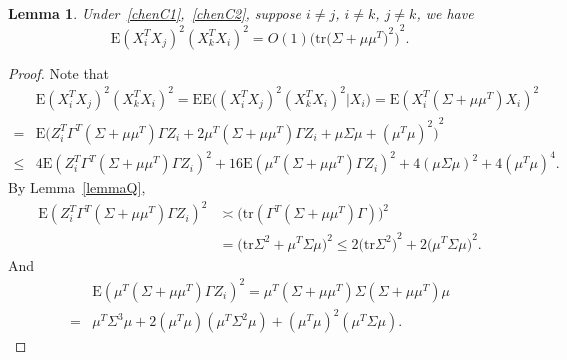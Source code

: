 \documentclass[review]{elsarticle}
\theoremstyle{plain}
\newtheorem{lemma}{Lemma}
\theoremstyle{definition}
\theoremstyle{remark}
\begin{document}
\begin{lemma}\label{smallLemma2}
    Under~\eqref{chenC1},~\eqref{chenC2}, suppose $i\neq j$, $i\neq k$, $j\neq k$, we have
    \begin{equation}\label{eq:2}
            \mathrm{E}{(X_i^T X_j)}^2{(X_k^T X_i)}^2=
             O(1){\Big(\mathrm{tr}{\big(\Sigma+\mu\mu^T\big)}^2\Big)}^2.
    \end{equation}
\end{lemma}
\begin{proof}
Note that
    \begin{equation*}
        \begin{aligned}
            &\mathrm{E}{(X_i^T X_j)}^2{(X_k^T X_i)}^2
            = 
            \mathrm{E}\mathrm{E}\big({(X_i^T X_j)}^2{(X_k^T X_i)}^2| X_i\big)
            =
            \mathrm{E}{(X_i^T (\Sigma+\mu\mu^T) X_i )}^2\\
            =&
            \mathrm{E}{\big(Z_i^T \Gamma^T (\Sigma+\mu\mu^T) \Gamma Z_i+ 2\mu^T (\Sigma+\mu\mu^T)\Gamma Z_i +\mu \Sigma \mu +(\mu^T\mu)^2 \big)}^2\\
            \leq&
            4\mathrm{E}(Z_i^T \Gamma^T (\Sigma+\mu\mu^T) \Gamma Z_i)^2+ 16\mathrm{E}(\mu^T (\Sigma+\mu\mu^T)\Gamma Z_i)^2 +4(\mu \Sigma \mu)^2 +4(\mu^T\mu)^4.
        \end{aligned}
    \end{equation*}
    By Lemma~\eqref{lemmaQ},
    \begin{equation*}
        \begin{aligned}
\mathrm{E}(Z_i^T \Gamma^T (\Sigma+\mu\mu^T) \Gamma Z_i)^2
            &\asymp
\big(\mathrm{tr}(\Gamma^T (\Sigma+\mu\mu^T)\Gamma)\big)^2\\
            &=
\big(\mathrm{tr}\Sigma^2+\mu^T\Sigma \mu\big)^2
            \leq
            2{\big(\mathrm{tr}\Sigma^2\big)}^2+2{\big(\mu^T\Sigma \mu\big)}^2.
        \end{aligned}
    \end{equation*}
    And
    \begin{equation*}
        \begin{aligned}
            &\mathrm{E}(\mu^T (\Sigma+\mu\mu^T)\Gamma Z_i)^2=
\mu^T (\Sigma+\mu\mu^T)\Sigma (\Sigma+\mu\mu^T)\mu\\
            =&\mu^T \Sigma^3 \mu+2(\mu^T\mu)(\mu^T\Sigma^2\mu)+{(\mu^T\mu)}^2(\mu^T\Sigma\mu).
        \end{aligned}
    \end{equation*}


\end{proof}
\end{document}
